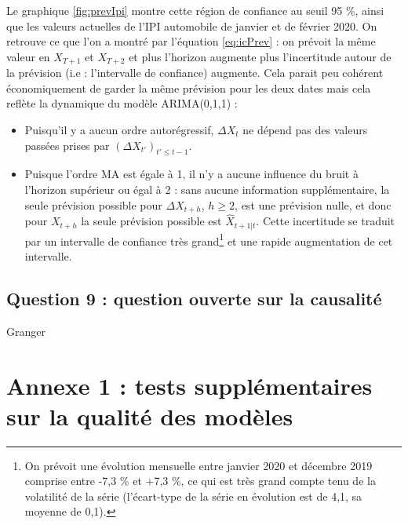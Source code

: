 \documentclass[,french]{article}
\begin{document}
Le graphique \ref{fig:prevIpi} montre cette région de confiance au seuil 95 \%, ainsi que les valeurs actuelles de l'IPI automobile de janvier et de février 2020.
On retrouve ce que l'on a montré par l'équation \eqref{eq:icPrev} : on prévoit la même valeur en \(X_{T+1}\) et \(X_{T+2}\) et plus l'horizon augmente plus l'incertitude autour de la prévision (i.e : l'intervalle de confiance) augmente.
Cela parait peu cohérent économiquement de garder la même prévision pour les deux dates mais cela reflète la dynamique du modèle ARIMA(0,1,1) :

\begin{itemize}
\item
  Puisqu'il y a aucun ordre autorégressif, \(\Delta X_t\) ne dépend pas des valeurs passées prises par \((\Delta X_{t'})_{t'\leq t-1}\).
\item
  Puisque l'ordre MA est égale à 1, il n'y a aucune influence du bruit à l'horizon supérieur ou égal à 2 : sans aucune information supplémentaire, la seule prévision possible pour \(\Delta X_{t+h}\), \(h\geq 2\), est une prévision nulle, et donc pour \(X_{t+h}\) la seule prévision possible est \(\hat X_{t+1\vert t}\).
  Cette incertitude se traduit par un intervalle de confiance très grand\footnote{On prévoit une évolution mensuelle entre janvier 2020 et décembre 2019 comprise entre -7,3 \% et +7,3 \%, ce qui est très grand compte tenu de la volatilité de la série (l'écart-type de la série en évolution est de 4,1, sa moyenne de 0,1).} et une rapide augmentation de cet intervalle.
\end{itemize}

\hypertarget{question-9-question-ouverte-sur-la-causalituxe9}{%
\subsection{Question 9 : question ouverte sur la causalité}\label{question-9-question-ouverte-sur-la-causalituxe9}}

Granger

\newpage

\hypertarget{appendix-appendix}{%
\appendix}


\hypertarget{sec:qualRes}{%
\section{Annexe 1 : tests supplémentaires sur la qualité des modèles}\label{sec:qualRes}}
\end{document}
